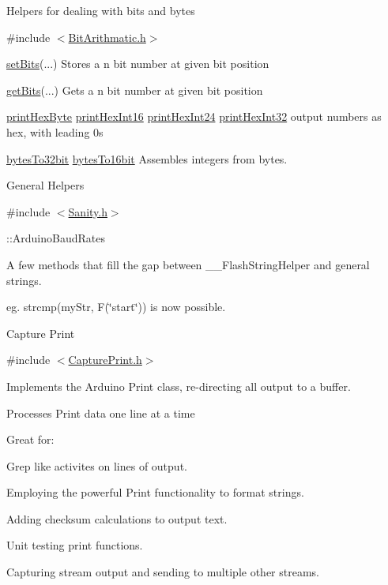 \begin{DoxyItemize}
\item Helpers for dealing with bits and bytes
\item \#include $<$\hyperlink{_bit_arithmatic_8h}{Bit\+Arithmatic.\+h}$>$
\item \hyperlink{_bit_arithmatic_8h_aabbf277315ff3b8310a7741925b56bc7}{set\+Bits}(...) Stores a n bit number at given bit position
\item \hyperlink{_bit_arithmatic_8h_a1131897261971e497cf6a4a83476fcdc}{get\+Bits}(...) Gets a n bit number at given bit position
\item \hyperlink{_bit_arithmatic_8h_a07b9d02b23a7b5526117bd66036cc516}{print\+Hex\+Byte} \hyperlink{_bit_arithmatic_8h_a2b7e446093fa0d1d250eea3d908ea28f}{print\+Hex\+Int16} \hyperlink{_bit_arithmatic_8h_af2a2e4872a45c5012fa0a63053e63f20}{print\+Hex\+Int24} \hyperlink{_bit_arithmatic_8h_ae6e1c4ca3c19e4a1e97ade02f5c7667b}{print\+Hex\+Int32} output numbers as hex, with leading 0\textquotesingle{}s
\item \hyperlink{_bit_arithmatic_8h_a1e55823ca5d6c66eba53036134820785}{bytes\+To32bit} \hyperlink{_bit_arithmatic_8h_aa0bec3f30220610f221e46f327d13bf9}{bytes\+To16bit} Assembles integers from bytes.
\end{DoxyItemize}

General Helpers
\begin{DoxyItemize}
\item \#include $<$\hyperlink{_sanity_8h}{Sanity.\+h}$>$
\item \+::\+Arduino\+Baud\+Rates
\item A few methods that fill the gap between \+\_\+\+\_\+\+Flash\+String\+Helper and general strings.
\begin{DoxyItemize}
\item eg. strcmp(my\+Str, F(\char`\"{}start\char`\"{})) is now possible.
\end{DoxyItemize}
\end{DoxyItemize}Capture Print
\begin{DoxyItemize}
\item \#include $<$\hyperlink{_capture_print_8h}{Capture\+Print.\+h}$>$
\item Implements the Arduino Print class, re-\/directing all output to a buffer.
\item Processes Print data one line at a time
\item Great for\+:
\begin{DoxyItemize}
\item Grep like activites on lines of output.
\item Employing the powerful Print functionality to format strings.
\item Adding checksum calculations to output text.
\item Unit testing print functions.
\item Capturing stream output and sending to multiple other streams.
\end{DoxyItemize}
\end{DoxyItemize}